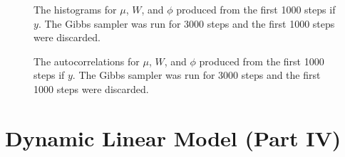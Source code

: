 \documentclass{article}
\begin{document}
\begin{figure}[!h]
\begin{center}
\end{center}
\label{DLM3:histograms}
\caption{The histograms for $\mu$, $W$, and $\phi$ produced from the first 1000 steps if $y$.  The Gibbs sampler was run for 3000 steps and the first 1000 steps were discarded.}
\end{figure}

\begin{figure}[!h]
\begin{center}
\end{center}
\caption{The autocorrelations for $\mu$, $W$, and $\phi$ produced from the first 1000 steps if $y$.  The Gibbs sampler was run for 3000 steps and the first 1000 steps were discarded.}
\end{figure}


\section{Dynamic Linear Model (Part IV)}
\end{document}
